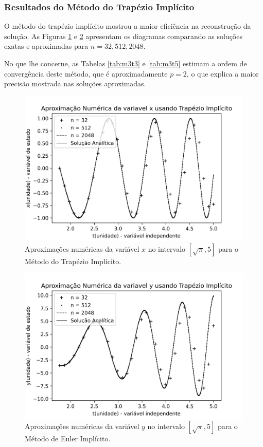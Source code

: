 \documentclass[twocolumn,amsmath,amssymb,floatfix]{revtex4}
\begin{document}
\subsubsection{Resultados do Método do Trapézio Implícito}
O método do trapézio implícito mostrou a maior eficiência na reconstrução da solução. As Figuras \ref{fig:m3t3} e \ref{fig:m3t5} apresentam os diagramas comparando as soluções exatas e aproximadas para $n=32,512,2048$.

No que lhe concerne, as Tabelas \ref{tab:m3t3} e \ref{tab:m3t5} estimam a ordem de convergência deste método, que é aproximadamente $p=2$, o que explica a maior precisão mostrada nas soluções aproximadas.

\begin{figure}[H]
\centering
\includegraphics[scale=0.55]{images/metodo_3x_T5.0.png}
\caption{Aproximações numéricas da variável $x$ no intervalo $[\sqrt{\pi},5]$ para o Método do Trapézio Implícito.}
\label{fig:m3t3}
\end{figure}

\begin{figure}[H]
\centering
\includegraphics[scale=0.55]{images/metodo_3y_T5.0.png}
\caption{Aproximações numéricas da variável $y$ no intervalo $[\sqrt{\pi},5]$ para o Método de Euler Implícito.}
\label{fig:m3t5}
\end{figure}
\end{document}
